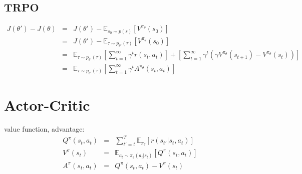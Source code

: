 \documentclass{article}
\begin{document}
\subsection{TRPO}
\begin{eqnarray*}
J(\theta')-J(\theta)&=&J(\theta')-\mathbb{E}_{s_0\sim p(s)}[V^{\pi_{\theta}}(s_0)]\\
&=&J(\theta')-\mathbb{E}_{\tau\sim p_{\theta'}(\tau)}[V^{\pi_{\theta}}(s_0)]\\
&=&\mathbb{E}_{\tau\sim p_{\theta'}(\tau)}[\sum_{t=1}^{\infty}\gamma^t r(s_t, a_t)]+[\sum_{t=1}^{\infty}\gamma^t(\gamma V^{\pi_{\theta}}(s_{t+1})-V^{\pi_{\theta}}(s_t))]\\
&=&\mathbb{E}_{\tau\sim p_{\theta'}(\tau)}[\sum_{t=1}^{\infty}\gamma^t A^{\pi_{\theta}}(s_t, a_t)]
\end{eqnarray*}

\section{Actor-Critic}
value function, advantage:
\begin{eqnarray*}
Q^{\pi}(s_t, a_t)&=&\sum_{t'=t}^T \mathbb{E}_{\pi_{\theta}}[r(s_{t'}|s_t,a_t)]\\
V^{\pi}(s_t)&=& \mathbb{E}_{a_t\sim\pi_{\theta}(a_t|s_t)}[Q^{\pi}(s_t,a_t)]\\
A^{\pi}(s_t, a_t) &=& Q^{\pi}(s_t, a_t) - V^{\pi}(s_t)
\end{eqnarray*}
\end{document}
